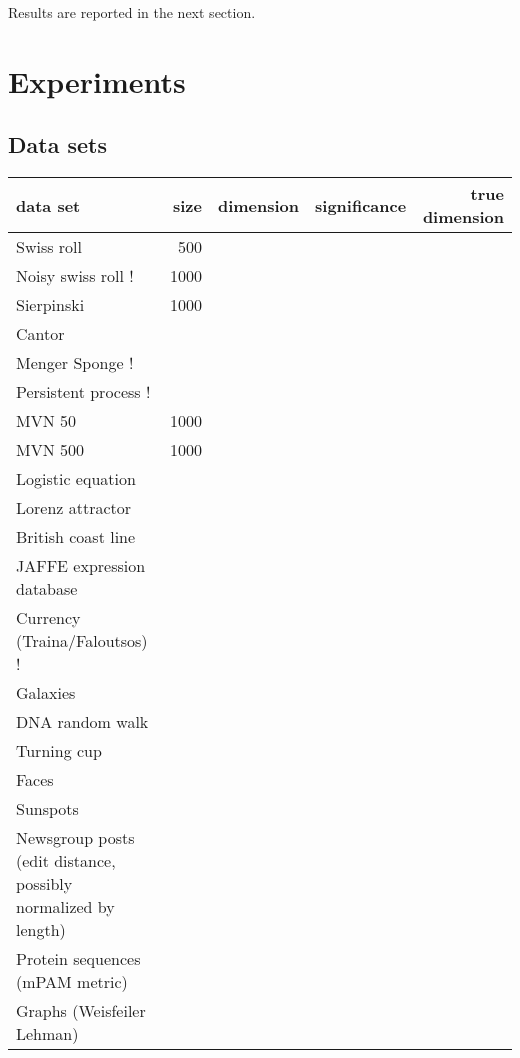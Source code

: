 \documentclass[11pt]{article}
\begin{document}
Results are reported in the next section. 
\section{Experiments}
\subsection{Data sets}

\pagebreak
\begin{landscape}

\begin{tabular}{l | r r r r}
\hline
data set & size & dimension & significance & true dimension \\
\hline
Swiss roll & 500 & & & \\
Noisy swiss roll ! & 1000 & & & \\ 
Sierpinski & 1000 & & & \\
Cantor & & & & \\
Menger Sponge ! & & & & \\
Persistent process ! & & & & \\
  
MVN 50 & 1000 & & & \\ 
MVN 500 & 1000 & & & \\

Logistic equation & & & & \\
Lorenz attractor & & & & \\
 
British coast line & & & & \\   
JAFFE expression database & & & & \\
Currency (Traina/Faloutsos) ! & & & & \\
Galaxies & & & & \\
DNA random walk & & & & \\
Turning cup & & & & \\ 
Faces & & & & \\ 
Sunspots & & & & \\

Newsgroup posts (edit distance, possibly normalized by length) & & & & \\
Protein sequences (mPAM metric) & & & & \\
Graphs (Weisfeiler Lehman) & & & & \\
\hline
\end{tabular}

\end{landscape}
\pagebreak
\end{document}
